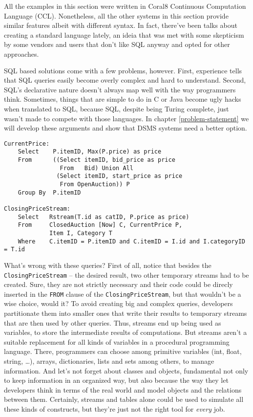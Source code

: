 \documentclass{report}
\begin{document}
All the examples in this section were written in Coral8 Continuous Computation Language (CCL). Nonetheless, all the other systems in this section provide similar features albeit with different syntax. In fact, there've been talks about creating a standard language lately, an ideia that was met with some skepticism by some vendors and users that don't like SQL anyway and opted for other approaches.

SQL based solutions come with a few problems, however. First, experience tells that SQL queries easily become overly complex and hard to understand. Second, SQL's declarative nature doesn't always map well with the way programmers think. Sometimes, things that are simple to do in C or Java become ugly hacks when translated to SQL, because SQL, despite being Turing complete, just wasn't made to compete with those languages. In chapter \ref{problem-statement} we will develop these arguments and show that DSMS systems need a better option.

\begin{verbatim}
CurrentPrice: 
    Select    P.itemID, Max(P.price) as price
    From      ((Select itemID, bid_price as price 
                From   Bid) Union All
               (Select itemID, start_price as price 
                From OpenAuction)) P
    Group By  P.itemID

ClosingPriceStream:
    Select   Rstream(T.id as catID, P.price as price)
    From     ClosedAuction [Now] C, CurrentPrice P, 
             Item I, Category T    
    Where    C.itemID = P.itemID and C.itemID = I.id and I.categoryID = T.id 
\end{verbatim}

What's wrong with these queries? First of all, notice that besides the \verb=ClosingPriceStream= -- the desired result, two other temporary streams had to be created. Sure, they are not strictly necessary and their code could be direcly inserted in the \verb=FROM= clause of the \verb=ClosingPriceStream=, but that wouldn't be a wise choice, would it? To avoid creating big and complex queries, developers partitionate them into smaller ones that write their results to temporary streams that are then used by other queries. Thus, streams end up being used as variables, to store the intermediate results of computations. But streams aren't a suitable replacement for all kinds of variables in a procedural programming language. There, programmers can choose among primitive variables (int, float, string, \dots), arrays, dictionaries, lists and sets among others, to manage information. And let's not forget about classes and objects, fundamental not only to keep information in an organized way, but also because the way they let developers think in terms of the real world and model objects and the relations between them. Certainly, streams and tables alone could be used to simulate all these kinds of constructs, but they're just not the right tool for \emph{every} job.
\end{document}
